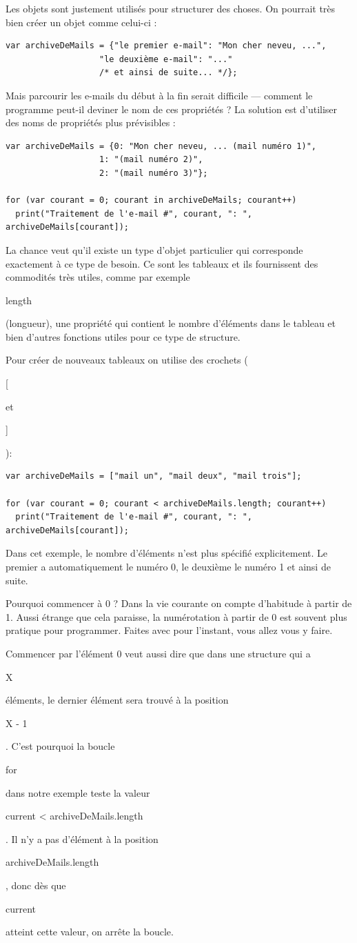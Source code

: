 \documentclass{FramateX}
\renewcommand{\texttt}[1]{\begin{sffamily}{#1}\end{sffamily}}
\begin{document}
Les objets sont justement utilisés pour structurer des choses. On
pourrait très bien créer un objet comme celui-ci :

\begin{lstlisting}
var archiveDeMails = {"le premier e-mail": "Mon cher neveu, ...",
                   "le deuxième e-mail": "..."
                   /* et ainsi de suite... */};
\end{lstlisting}
Mais parcourir les e-mails du début à la fin serait difficile ---
comment le programme peut-il deviner le nom de ces propriétés ? La
solution est d'utiliser des noms de propriétés plus prévisibles :

\begin{lstlisting}
var archiveDeMails = {0: "Mon cher neveu, ... (mail numéro 1)",
                   1: "(mail numéro 2)",
                   2: "(mail numéro 3)"};

for (var courant = 0; courant in archiveDeMails; courant++)
  print("Traitement de l'e-mail #", courant, ": ", archiveDeMails[courant]);
\end{lstlisting}
La chance veut qu'il existe un type d'objet particulier qui corresponde
exactement à ce type de besoin. Ce sont les tableaux et ils fournissent
des commodités très utiles, comme par exemple \texttt{length}
(longueur), une propriété qui contient le nombre d'éléments dans le
tableau et bien d'autres fonctions utiles pour ce type de structure.

Pour créer de nouveaux tableaux on utilise des crochets (\texttt{{[}} et
\texttt{{]}}):

\begin{lstlisting}
var archiveDeMails = ["mail un", "mail deux", "mail trois"];

for (var courant = 0; courant < archiveDeMails.length; courant++)
  print("Traitement de l'e-mail #", courant, ": ", archiveDeMails[courant]);
\end{lstlisting}
Dans cet exemple, le nombre d'éléments n'est plus spécifié
explicitement. Le premier a automatiquement le numéro 0, le deuxième le
numéro 1 et ainsi de suite.

Pourquoi commencer à 0 ? Dans la vie courante on compte d'habitude à
partir de 1. Aussi étrange que cela paraisse, la numérotation à partir
de 0 est souvent plus pratique pour programmer. Faites avec pour
l'instant, vous allez vous y faire.

Commencer par l'élément 0 veut aussi dire que dans une structure qui a
\texttt{X} éléments, le dernier élément sera trouvé à la position
\texttt{X - 1}. C'est pourquoi la boucle \texttt{for} dans notre exemple
teste la valeur \texttt{current \textless{} archiveDeMails.length}. Il
n'y a pas d'élément à la position \texttt{archiveDeMails.length}, donc
dès que \texttt{current} atteint cette valeur, on arrête la boucle.
\end{document}
